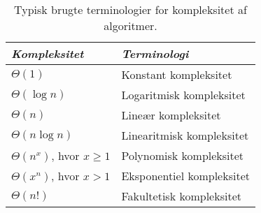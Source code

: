 \begin{table}[H]
\centering
\begin{tabular}{|ll|}
\hline
\textbf{\textit{Kompleksitet}}           & \textbf{\textit{Terminologi}}           \\ \hline
$\Theta (1)$ & Konstant kompleksitet          \\
$\Theta (\log n)$  & Logaritmisk kompleksitet          \\
$\Theta (n)$  & Lineær kompleksitet          \\
$\Theta (n \log n)$  & Linearitmisk kompleksitet        \\
$\Theta (n^x)$, hvor $x \geq 1$  & Polynomisk kompleksitet          \\
$\Theta (x^n)$, hvor $x>1$  & Eksponentiel kompleksitet          \\
$\Theta (n!)$  & Fakultetisk kompleksitet          \\ \hline
\end{tabular}
\caption{Typisk brugte terminologier for kompleksitet af algoritmer.}
\label{tab:kompleksitet}
\end{table}
